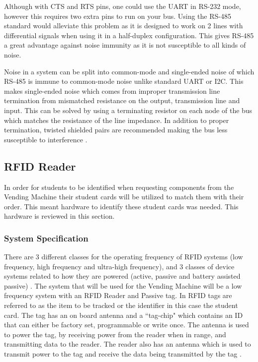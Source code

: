 \documentclass[a4paper,11pt]{article}
\numberwithin{figure}{section}
\numberwithin{table}{section}
\begin{document}
Although with CTS and RTS pins, one could use the UART in RS-232 mode, however this requires two extra pins to run on your bus. Using the RS-485 standard would alleviate this problem as it is designed to work on 2 lines with differential signals when using it in a half-duplex configuration. This gives RS-485 a great advantage against noise immunity as it is not susceptible to all kinds of noise. 

Noise in a system can be split into common-mode and single-ended noise of which RS-485 is immune to common-mode noise unlike standard UART or I2C. This makes single-ended noise which comes from improper transmission line termination from mismatched resistance on the output, transmission line and input. This can be solved by using a terminating resistor on each node of the bus which matches the resistance of the line impedance. In addition to proper termination, twisted shielded pairs are recommended making the bus less susceptible to interference \cite{dif}. 

\subsection{RFID Reader}
In order for students to be identified when requesting components from the Vending Machine their student cards will be utilized to match them with their order. This meant hardware to identify these student cards was needed. This hardware is reviewed in this section.

\subsubsection{System Specification}
There are 3 different classes for the operating frequency of RFID systems (low frequency, high frequency and ultra-high frequency), and 3 classes of device systems related to how they are powered (active, passive and battery assisted passive) \cite{rfidsys}. The system that will be used for the Vending Machine will be a low frequency system with an RFID Reader and Passive tag. In RFID tags are referred to as the item to be tracked or the identifier in this case the student card. The tag has an on board antenna and a ``tag-chip" which contains an ID that can either be factory set, programmable or write once. The antenna is used to power the tag, by receiving power from the reader when in range, and transmitting data to the reader. The reader also has an antenna which is used to transmit power to the tag and receive the data being transmitted by the tag \cite{rfidhow}.
\end{document}
